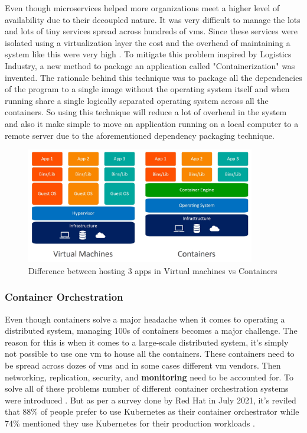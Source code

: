 Even though microservices helped more organizations meet a higher level of availability due to their decoupled nature. It was very difficult to manage the lots and lots of tiny services spread across hundreds of \acp{vm}. Since these services were isolated using a virtualization layer the cost and the overhead of maintaining a system like this were very high \citep{dua2014virtualization}. To mitigate this problem inspired by Logistics Industry, a new method to package an application called "Containerization" was invented. The rationale behind this technique was to package all the dependencies of the program to a single image without the operating system itself and when running share a single logically separated operating system across all the containers. So using this technique will reduce a lot of overhead in the system and also it make simple to move an application running on a local computer to a remote server due to the aforementioned dependency packaging technique.

\begin{figure}[H]
    \includegraphics[width=10cm]{assets/literature-review/containers-vs-virtual-machines.jpg}
    \caption{Difference between hosting 3 apps in Virtual machines vs Containers \citep{Dockervs91:online}}
\end{figure}

\subsubsection{Container Orchestration}

Even though containers solve a major headache when it comes to operating a distributed system, managing 100s of containers becomes a major challenge. The reason for this is when it comes to a large-scale distributed system, it's simply not possible to use one \ac{vm} to house all the containers. These containers need to be spread across dozes of \acp{vm} and in some cases different \ac{vm} vendors. Then networking, replication, security, and \textbf{monitoring} need to be accounted for. To solve all of these problems number of different container orchestration systems were introduced \citep{ElasticityCloudComputing}. But as per a survey done by Red Hat in July 2021, it's reviled that 88\% of people prefer to use Kubernetes as their container orchestrator while 74\% mentioned they use Kubernetes for their production workloads \citep{Kubernet59:online}.

